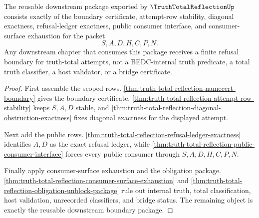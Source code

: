 \begin{theorem}
\label{thm:truth-total-reflection-downstream-boundary-package}
The reusable downstream package exported by $\TruthTotalReflectionUp$ consists exactly of the boundary certificate, attempt-row stability, diagonal exactness, refusal-ledger exactness, public consumer interface, and consumer-surface exhaustion for the packet
$$
S,A,D,H,C,P,N.
$$
Any downstream chapter that consumes this package receives a finite refusal boundary for truth-total attempts, not a BEDC-internal truth predicate, a total truth classifier, a host validator, or a bridge certificate.
\end{theorem}
\begin{proof}
First assemble the scoped rows. \autoref{thm:truth-total-reflection-namecert-boundary} gives the boundary certificate, \autoref{thm:truth-total-reflection-attempt-row-stability} keeps $S,A,D$ stable, and \autoref{thm:truth-total-reflection-diagonal-obstruction-exactness} fixes diagonal exactness for the displayed attempt.

Next add the public rows. \autoref{thm:truth-total-reflection-refusal-ledger-exactness} identifies $A,D$ as the exact refusal ledger, while \autoref{thm:truth-total-reflection-public-consumer-interface} forces every public consumer through $S,A,D,H,C,P,N$.

Finally apply consumer-surface exhaustion and the obligation package. \autoref{thm:truth-total-reflection-consumer-surface-exhaustion} and \autoref{thm:truth-total-reflection-obligation-unblock-package} rule out internal truth, total classification, host validation, unrecorded classifiers, and bridge status. The remaining object is exactly the reusable downstream boundary package.
\end{proof}

